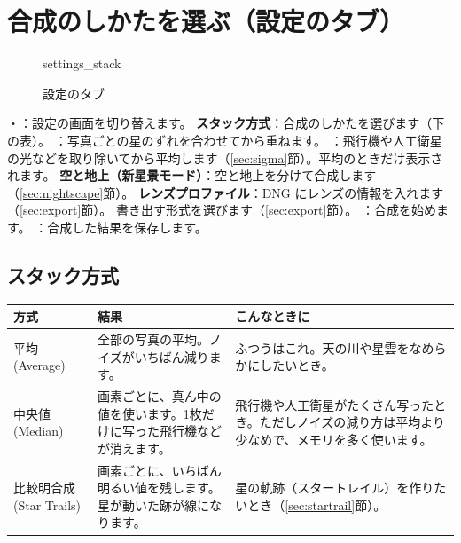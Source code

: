 \clearpage
\section{合成のしかたを選ぶ（設定のタブ）}\label{sec:stacking}

\begin{figure}[H]
\centering
\begin{screenshot}[0.46\linewidth]{settings_stack}
\end{screenshot}
\caption{設定のタブ}
\end{figure}

\begin{callouts}
 ・：設定の画面を切り替えます。
 \textbf{スタック方式}：合成のしかたを選びます（下の表）。
 ：写真ごとの星のずれを合わせてから重ねます。
 ：飛行機や人工衛星の光などを取り除いてから平均します（\ref{sec:sigma}節）。平均のときだけ表示されます。
 \textbf{空と地上（新星景モード）}：空と地上を分けて合成します（\ref{sec:nightscape}節）。
 \textbf{レンズプロファイル}：DNG にレンズの情報を入れます（\ref{sec:export}節）。
 書き出す形式を選びます（\ref{sec:export}節）。
 ：合成を始めます。
 ：合成した結果を保存します。
\end{callouts}

\subsection{スタック方式}

\begin{center}
\small
\begin{tabularx}{\linewidth}{l X X}
\toprule
方式 & 結果 & こんなときに \\
\midrule
平均 (Average) & 全部の写真の平均。ノイズがいちばん減ります。 & ふつうはこれ。天の川や星雲をなめらかにしたいとき。 \\
中央値 (Median) & 画素ごとに、真ん中の値を使います。1枚だけに写った飛行機などが消えます。 & 飛行機や人工衛星がたくさん写ったとき。ただしノイズの減り方は平均より少なめで、メモリを多く使います。 \\
比較明合成 (Star Trails) & 画素ごとに、いちばん明るい値を残します。星が動いた跡が線になります。 & 星の軌跡（スタートレイル）を作りたいとき（\ref{sec:startrail}節）。 \\
\bottomrule
\end{tabularx}
\end{center}

